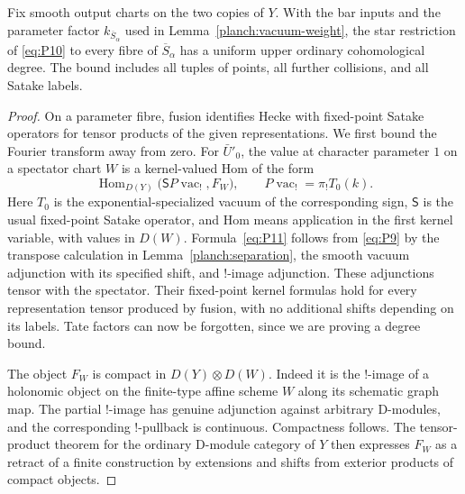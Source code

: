 \begin{lemma}
\label{planch:satake-degree}
Fix smooth output charts on the two copies of $Y$.  With the bar inputs
and the parameter factor $k_{\overline S_\alpha}$ used in
Lemma~\ref{planch:vacuum-weight}, the star restriction of
\eqref{eq:P10} to every fibre of $\overline S_\alpha$ has a uniform
upper ordinary cohomological degree.  The bound includes all tuples
of points, all further collisions, and all Satake labels.
\end{lemma}

\begin{proof}
On a parameter fibre, fusion identifies Hecke with fixed-point
Satake operators for tensor products of the given representations.
We first bound the Fourier transform away from zero.  For
$\bar U'_0$, the value at character parameter $1$ on a spectator
chart $W$ is a kernel-valued Hom of the form
\begin{equation}
 \operatorname{Hom}_{D(Y)}
       \bigl(\mathsf S P\operatorname{vac}_!,F_W\bigr),
 \qquad P\operatorname{vac}_!=\pi_!T_0(k).
 \label{eq:P11}
\end{equation}
Here $T_0$ is the exponential-specialized vacuum of the corresponding
sign, $\mathsf S$ is the usual fixed-point Satake operator, and Hom
means application in the first kernel variable, with values in
$D(W)$.  Formula~\eqref{eq:P11} follows from \eqref{eq:P9} by the
transpose calculation in Lemma~\ref{planch:separation}, the smooth
vacuum adjunction with its specified shift, and $!$-image adjunction.
These adjunctions tensor with the spectator.  Their fixed-point
kernel formulas hold for every representation tensor produced by
fusion, with no additional shifts depending on its labels.  Tate
factors can now be forgotten, since we are proving a degree bound.

The object $F_W$ is compact in $D(Y)\otimes D(W)$.  Indeed it is the
$!$-image of a holonomic object on the finite-type affine scheme $W$
along its schematic graph map.  The partial $!$-image has genuine
adjunction against arbitrary D-modules, and the corresponding
$!$-pullback is continuous.  Compactness follows.  The tensor-product
theorem for the ordinary D-module category of $Y$ then expresses
$F_W$ as a retract of a finite construction by extensions and shifts
from exterior products of compact objects.


\end{proof}
